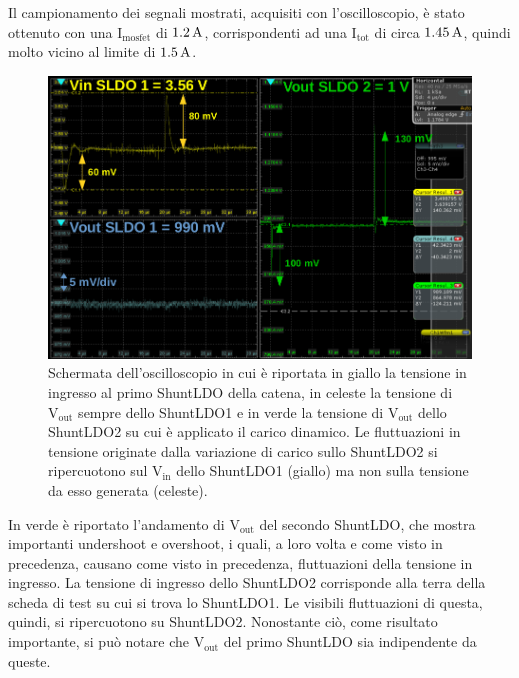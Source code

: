 Il campionamento dei segnali mostrati, acquisiti con l'oscilloscopio, è stato ottenuto con una $\mathrm{I_{mosfet}}$ di $1.2 \rm \, A$, corrispondenti ad una $\mathrm{I_{tot}}$ di circa $1.45 \rm \, A$, quindi molto vicino al limite di $1.5 \rm \, A$. 
\begin{figure}[h!]
\centering
\includegraphics[scale=.32]{Immagini/ScreenSerie}
\caption{Schermata dell'oscilloscopio in cui è riportata in giallo la tensione in ingresso al primo ShuntLDO della catena,  in celeste la tensione di $\mathrm{V_{out}}$ sempre dello ShuntLDO1 e in verde la tensione di $\mathrm{V_{out}}$ dello ShuntLDO2 su cui è applicato il carico dinamico. Le fluttuazioni in tensione originate dalla variazione di carico sullo ShuntLDO2 si ripercuotono sul $\mathrm{V_{in}}$ dello ShuntLDO1 (giallo) ma non sulla tensione da esso generata (celeste).}
\label{ScreenSerie}
\end{figure}
In verde è riportato l'andamento di $\mathrm{V_{out}}$ del secondo ShuntLDO, che mostra importanti undershoot e overshoot, i quali, a loro volta e come visto in precedenza, causano come visto in precedenza, fluttuazioni della tensione in ingresso. 
La tensione di ingresso dello ShuntLDO2 corrisponde alla terra della scheda di test su cui si trova lo ShuntLDO1.
Le visibili fluttuazioni di questa, quindi, si ripercuotono su ShuntLDO2.
Nonostante ciò, come risultato importante, si può notare che $\mathrm{V_{out}}$ del primo ShuntLDO sia indipendente da queste.

